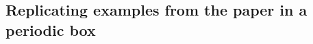 \documentclass[11pt, a4paper]{article}
\theoremstyle{definition}
\begin{document}

\subsection{Replicating examples from the paper in a periodic box}
%
%
%
%
%
%
\end{document}
